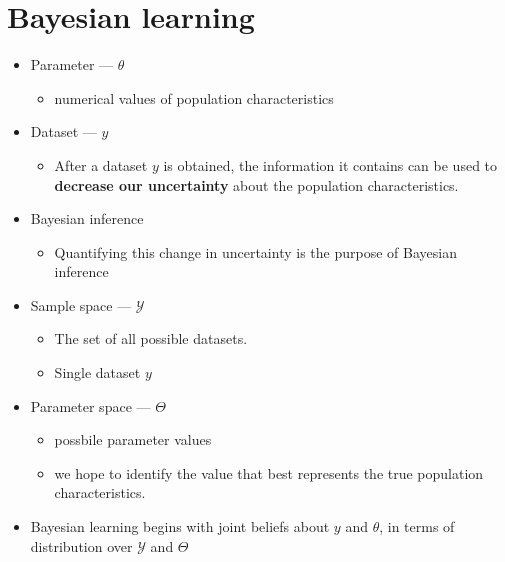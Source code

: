 \documentclass[
  letterpaper,
  DIV=11,
  numbers=noendperiod]{scrreprt}
\providecommand{\tightlist}{%
  \setlength{\itemsep}{0pt}\setlength{\parskip}{0pt}}\usepackage{longtable,booktabs,array}
\begin{document}
\hypertarget{bayesian-learning}{%
\section{Bayesian learning}\label{bayesian-learning}}

\begin{itemize}
\tightlist
\item
  Parameter --- \(\theta\)

  \begin{itemize}
  \tightlist
  \item
    numerical values of population characteristics
  \end{itemize}
\item
  Dataset --- \(y\)

  \begin{itemize}
  \tightlist
  \item
    After a dataset \(y\) is obtained, the information it contains can
    be used to \textbf{decrease our uncertainty} about the population
    characteristics.
  \end{itemize}
\item
  Bayesian inference

  \begin{itemize}
  \tightlist
  \item
    Quantifying this change in uncertainty is the purpose of Bayesian
    inference
  \end{itemize}
\item
  Sample space --- \(\mathcal{Y}\)

  \begin{itemize}
  \tightlist
  \item
    The set of all possible datasets.
  \item
    Single dataset \(y\)
  \end{itemize}
\item
  Parameter space --- \(\Theta\)

  \begin{itemize}
  \tightlist
  \item
    possbile parameter values
  \item
    we hope to identify the value that best represents the true
    population characteristics.
  \end{itemize}
\item
  Bayesian learning begins with joint beliefs about \(y\) and
  \(\theta\), in terms of distribution over \(\mathcal{Y}\) and
  \(\Theta\)


\end{itemize}
\end{document}
